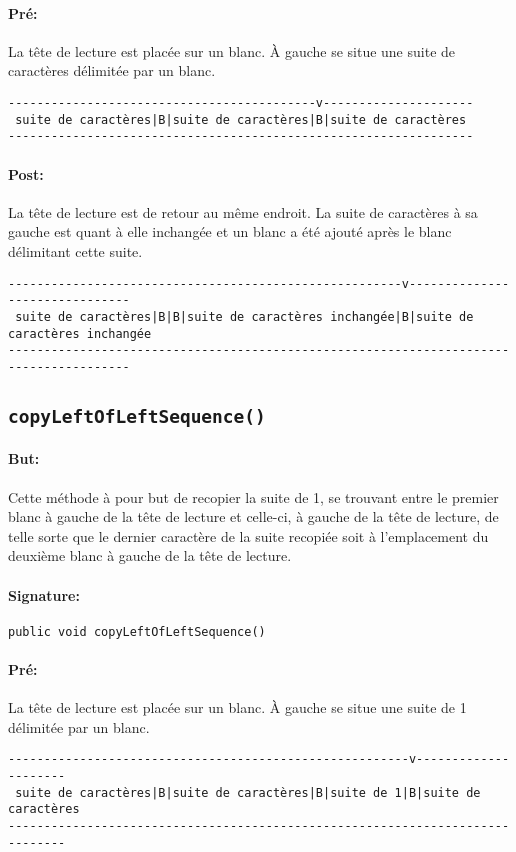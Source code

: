 \documentclass[a4paper,11pt]{article}
\begin{document}
\paragraph{Pré:} La tête de lecture est placée sur un blanc. À gauche se situe une suite de caractères délimitée par un blanc.
\begin{verbatim}
-------------------------------------------v---------------------
 suite de caractères|B|suite de caractères|B|suite de caractères
-----------------------------------------------------------------
\end{verbatim}
\paragraph{Post:} La tête de lecture est de retour au même endroit. La suite de caractères à sa gauche est quant à elle inchangée et un blanc a été ajouté après le blanc délimitant cette suite.
\begin{small}
\begin{verbatim}
-------------------------------------------------------v-------------------------------
 suite de caractères|B|B|suite de caractères inchangée|B|suite de caractères inchangée
---------------------------------------------------------------------------------------
\end{verbatim}
\end{small}
\subsection{\texttt{copyLeftOfLeftSequence()}}
\paragraph{But:} Cette méthode à pour but de recopier la suite de 1, se trouvant entre le premier blanc à gauche de la tête de lecture et celle-ci, à gauche de la tête de lecture, de telle sorte que le dernier caractère de la suite recopiée soit à l'emplacement du deuxième blanc à gauche de la tête de lecture.
\paragraph{Signature:} \texttt{public void copyLeftOfLeftSequence()}
\paragraph{Pré:} La tête de lecture est placée sur un blanc. À gauche se situe une suite de 1 délimitée par un blanc.
\begin{verbatim}
--------------------------------------------------------v---------------------
 suite de caractères|B|suite de caractères|B|suite de 1|B|suite de caractères
------------------------------------------------------------------------------
\end{verbatim}
\end{document}
